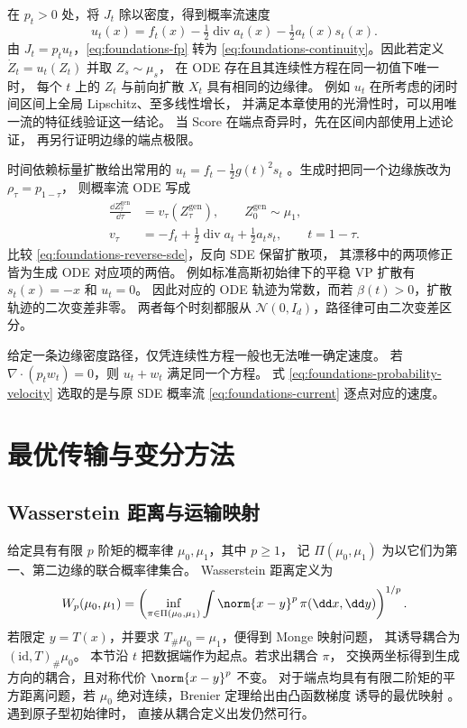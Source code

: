 在 \(p_t>0\) 处，将 \(J_t\) 除以密度，得到概率流速度
\begin{equation}
  \boxed{
    u_t(x)=f_t(x)-\tfrac12\operatorname{div}a_t(x)-\tfrac12 a_t(x)s_t(x).
  }
  \label{eq:foundations-probability-velocity}
\end{equation}
由 \(J_t=p_tu_t\)，\eqref{eq:foundations-fp} 转为
\eqref{eq:foundations-continuity}。因此若定义
\(\dot Z_t=u_t(Z_t)\) 并取 \(Z_s\sim\mu_s\)，
在 ODE 存在且其连续性方程在同一初值下唯一时，
每个 \(t\) 上的 \(Z_t\) 与前向扩散 \(X_t\) 具有相同的边缘律。
例如 \(u_t\) 在所考虑的闭时间区间上全局 Lipschitz、至多线性增长，
并满足本章使用的光滑性时，可以用唯一流的特征线验证这一结论。
当 Score 在端点奇异时，先在区间内部使用上述论证，
再另行证明边缘的端点极限。

时间依赖标量扩散给出常用的 \(u_t=f_t-\tfrac12g(t)^2s_t\)
\cite{song2021sde}。生成时把同一个边缘族改为 \(\rho_\tau=p_{1-\tau}\)，
则概率流 ODE 写成
\begin{equation}
  \begin{aligned}
    \frac{\dd Z_\tau^{\mathrm{gen}}}{\dd\tau}
      &=v_\tau(Z_\tau^{\mathrm{gen}}),\qquad Z_0^{\mathrm{gen}}\sim\mu_1,\\
    v_\tau
      &=-f_t+\tfrac12\operatorname{div}a_t+\tfrac12 a_t s_t,
        \qquad t=1-\tau .
  \end{aligned}
  \label{eq:foundations-generation-ode}
\end{equation}
比较 \eqref{eq:foundations-reverse-sde}，反向 SDE 保留扩散项，
其漂移中的两项修正皆为生成 ODE 对应项的两倍。
例如标准高斯初始律下的平稳 VP 扩散有 \(s_t(x)=-x\) 和 \(u_t=0\)。
因此对应的 ODE 轨迹为常数，而若 \(\beta(t)>0\)，扩散轨迹的二次变差非零。
两者每个时刻都服从 \(\mathcal N(0,I_d)\)，路径律可由二次变差区分。

给定一条边缘密度路径，仅凭连续性方程一般也无法唯一确定速度。
若 \(\nabla\cdot(p_t w_t)=0\)，则 \(u_t+w_t\) 满足同一个方程。
式 \eqref{eq:foundations-probability-velocity} 选取的是与原 SDE
概率流 \eqref{eq:foundations-current} 逐点对应的速度。

\section{最优传输与变分方法}

\subsection{Wasserstein 距离与运输映射}

给定具有有限 \(p\) 阶矩的概率律 \(\mu_0,\mu_1\)，其中 \(p\ge1\)，
记 \(\Pi(\mu_0,\mu_1)\) 为以它们为第一、第二边缘的联合概率律集合。
Wasserstein 距离定义为
\[
  W_p(\mu_0,\mu_1)
    =\left(\inf_{\pi\in\Pi(\mu_0,\mu_1)}
      \int\norm{x-y}^p\,\pi(\dd x,\dd y)\right)^{1/p}.
\]
若限定 \(y=T(x)\)，并要求 \(T_\#\mu_0=\mu_1\)，便得到 Monge 映射问题，
其诱导耦合为 \((\mathrm{id},T)_\#\mu_0\)。
本节沿 \(t\) 把数据端作为起点。若求出耦合 \(\pi\)，
交换两坐标得到生成方向的耦合，且对称代价 \(\norm{x-y}^p\) 不变。
对于端点均具有有限二阶矩的平方距离问题，若 \(\mu_0\) 绝对连续，Brenier 定理给出由凸函数梯度
诱导的最优映射 \cite{brenier1991polar}。遇到原子型初始律时，
直接从耦合定义出发仍然可行。

